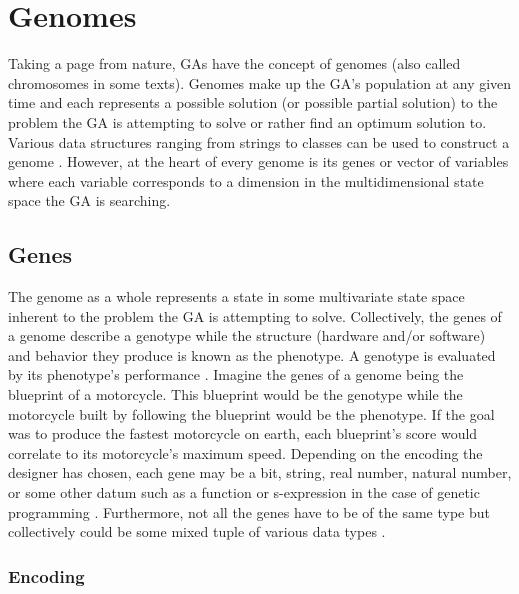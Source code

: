 \section{Genomes}

Taking a page from nature, GAs have the concept of genomes (also called chromosomes in some texts). Genomes make up the GA's population at any given time and each represents a possible solution (or possible partial solution) to the problem the GA is attempting to solve or rather find an optimum solution to. Various data structures ranging from strings to classes can be used to construct a genome \cite{ColinReeves}. However, at the heart of every genome is its genes or vector of variables where each variable corresponds to a dimension in the multidimensional state space the GA is searching.      

\subsection{Genes}

The genome as a whole represents a state in some multivariate state space inherent to the problem the GA is attempting to solve. Collectively, the genes of a genome describe a genotype while the structure (hardware and/or software) and behavior they produce is known as the phenotype. A genotype is evaluated by its phenotype's performance \cite{Beasley93anoverview}. Imagine the genes of a genome being the blueprint of a motorcycle. This blueprint would be the genotype while the motorcycle built by following the blueprint would be the phenotype. If the goal was to produce the fastest motorcycle on earth, each blueprint's score would correlate to its motorcycle's maximum speed. Depending on the encoding the designer has chosen, each gene may be a bit, string, real number, natural number, or some other datum such as a function or s-expression in the case of genetic programming \cite{DBLP:conf/aaai/KozaR92}. Furthermore, not all the genes have to be of the same type but collectively could be some mixed tuple of various data types \cite{ColinReeves}.      

\subsubsection{Encoding}

